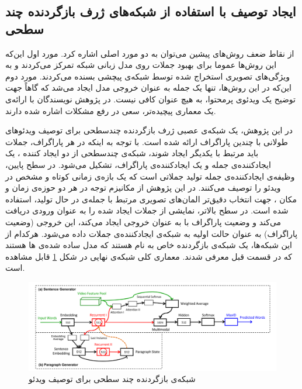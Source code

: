  \subsection{ایجاد توصیف با استفاده از شبکه‌های ژرف بازگردنده چند سطحی}\label{hierarchical-rnns}
از نقاط ضعف روش‌های پیشین می‌توان به دو مورد اصلی اشاره کرد. مورد اول این‌که این روش‌ها عموما برای بهبود جملات روی مدل زبانی شبکه تمرکز می‌کردند و به ویژگی‌های تصویری استخراج شده توسط شبکه‌ی پیچشی بسنده می‌کردند. مورد دوم این‌که در این روش‌ها، تنها یک جمله به عنوان خروجی مدل ایجاد می‌شد که گاهاً جهت توضیح یک ویدئو‌ی پرمحتوا، به هیچ عنوان کافی نیست. در پژوهش 
\cite{Yu2016}
نویسندگان با ارائه‌ی یک معماری پیچیده‌تر، سعی در رفع مشکلات اشاره شده دارند.

در این پژوهش، یک شبکه‌ی عصبی ژرف بازگردنده چند‌سطحی برای توصیف ویدئو‌های طولانی با چندین پاراگراف ارائه شده است. با توجه به اینکه در هر پاراگراف، جملات باید مرتبط با یکدیگر ایجاد شوند، شبکه‌ی چند‌سطحی از دو ایجاد کننده
، یک ایجاد‌کننده‌ی جمله و یک ایجاد‌کننده‌ی پاراگراف، تشکیل می‌شود. در سطح پایین، وظیفه‌ی ایجادکننده‌ی جمله تولید جملاتی است که یک بازه‌ی زمانی کوتاه و مشخص در ویدئو را توصیف می‌کنند.  در این پژوهش از مکانیزم توجه 
در هر دو حوزه‌ی زمان و مکان ، جهت انتخاب دقیق‌تر المان‌های تصویری مرتبط با جمله‌ی در حال تولید، استفاده شده است. در سطح بالاتر، نمایشی از جملات ایجاد شده را به عنوان ورودی دریافت می‌کند و وضعیت پاراگراف با به عنوان خروجی ایجاد می‌کند، این خروجی (وضعیت پاراگراف) به عنوان حالت اولیه به شبکه‌ی ایجاد‌کننده‌ی جملات داده می‌شود. هرکدام از این شبکه‌ها، یک شبکه‌ی بازگردنده خاص به نام
  \cite{chung2014empirical}
هستند که مدل ساده‌ شده‌ی ها هستند که در قسمت‌ قبل معرفی شدند. معماری کلی شبکه‌ی نهایی در شکل \ref{hrnn} قابل مشاهده است.

\begin{figure}[ht!]
	\centering
	\includegraphics[width=170mm]{images/hrnn.png}
	\caption{شبکه‌ی بازگردنده چند سطحی برای توصیف ویدئو\label{hrnn}}
\end{figure}

